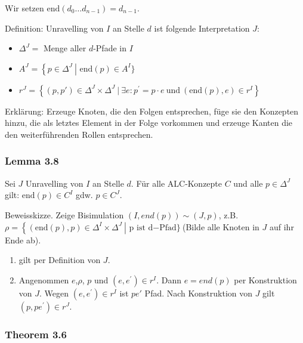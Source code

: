 Wir setzen
$\text{end}\left( d_{0}\ldots d_{n - 1} \right) = d_{n - 1}$.

Definition: Unravelling von $I$ an Stelle $d$ ist folgende
Interpretation $J$:

\begin{itemize}
\item
  $\Delta^{J} =$ Menge aller $d$-Pfade in $I$
\item
  $A^{J} = \left\{ p \in \Delta^{J}\  \right|\text{\ end}\left( p \right) \in A^{I}\}$
\item
  $r^{J} = \left\{ \left( p,p' \right) \in \Delta^{J} \times \Delta^{J}\ |\ \exists e:p^{'} = p \cdot e\ \mathrm{\text{und}}\ \left( \text{end}\left( p \right),e \right) \in r^{I} \right\}$
\end{itemize}

Erklärung: Erzeuge Knoten, die den Folgen entsprechen, füge sie den
Konzepten hinzu, die als letztes Element in der Folge vorkommen und
erzeuge Kanten die den weiterführenden Rollen entsprechen.

\hypertarget{lemma-3.8}{\subsubsection{Lemma 3.8}\label{lemma-3.8}}

Sei $J$ Unravelling von $I$ an Stelle $d$. Für alle ALC-Konzepte
$C$ und alle $p \in \Delta^{J}$ gilt:
$\text{end}\left( p \right) \in C^{I}$ gdw. $p \in C^{J}$.

Beweisskizze. Zeige Bisimulation
$\left( I,end\left( p \right) \right)\sim\left( J,p \right)$, z.B.
$\rho = \left\{ \left( \text{end}\left( p \right),p \right) \in \Delta^{I} \times \Delta^{J}\  \right|\text{\ p\ }\mathrm{\text{ist}}\text{\ d}\mathrm{- Pfad}\}\ $(Bilde
alle Knoten in $J$ auf ihr Ende ab).

\begin{enumerate}
\def\labelenumi{\arabic{enumi}.}
\item
  gilt per Definition von $J$.
\item
  Angenommen $e$,$\rho$, $p$ und
  $\left( e,e^{'} \right) \in r^{I}$. Dann $e = end\left( p \right)$
  per Konstruktion von $J$. Wegen $\left( e,e^{'} \right) \in r^{I}$
  ist $pe'$ Pfad. Nach Konstruktion von $J$ gilt
  $\left( p,pe^{'} \right) \in r^{J}$.
\end{enumerate}

\subsubsection{Theorem 3.6}\label{theorem-3.6-1}

